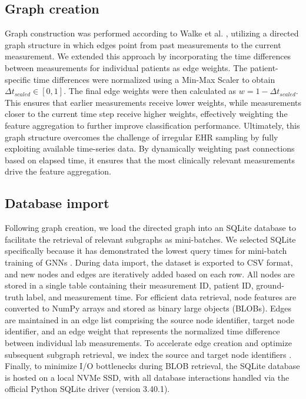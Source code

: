 \documentclass[pdflatex,sn-mathphys-num,lineno]{sn-jnl}
\theoremstyle{thmstyleone}%
\theoremstyle{thmstyletwo}%
\theoremstyle{thmstylethree}%
\begin{document}
\subsection{Graph creation}\label{methods:graph_creation}
Graph construction was performed according to Walke et al. \cite{walke2023edges}, utilizing a directed graph structure in which edges point from past measurements to the current measurement. We extended this approach by incorporating the time differences between measurements for individual patients as edge weights. The patient-specific time differences were normalized using a Min-Max Scaler to obtain $\Delta t_{scaled} \in [0, 1]$. The final edge weights were then calculated as $w = 1 - \Delta t_{scaled}$. This ensures that earlier measurements receive lower weights, while measurements closer to the current time step receive higher weights, effectively weighting the feature aggregation to further improve classification performance. Ultimately, this graph structure overcomes the challenge of irregular EHR sampling by fully exploiting available time-series data. By dynamically weighting past connections based on elapsed time, it ensures that the most clinically relevant measurements drive the feature aggregation.

\subsection{Database import}\label{methods:database_import}
Following graph creation, we load the directed graph into an SQLite database to facilitate the retrieval of relevant subgraphs as mini-batches. We selected SQLite specifically because it has demonstrated the lowest query times for mini-batch training of GNNs \cite{walke2026evaluation}. During data import, the dataset is exported to CSV format, and new nodes and edges are iteratively added based on each row. All nodes are stored in a single table containing their measurement ID, patient ID, ground-truth label, and measurement time. For efficient data retrieval, node features are converted to NumPy arrays and stored as binary large objects (BLOBs). Edges are maintained in an edge list comprising the source node identifier, target node identifier, and an edge weight that represents the normalized time difference between individual lab measurements. To accelerate edge creation and optimize subsequent subgraph retrieval, we index the source and target node identifiers \cite{walke2026evaluation}. Finally, to minimize I/O bottlenecks during BLOB retrieval, the SQLite database is hosted on a local NVMe SSD, with all database interactions handled via the official Python SQLite driver (version 3.40.1).
\end{document}
